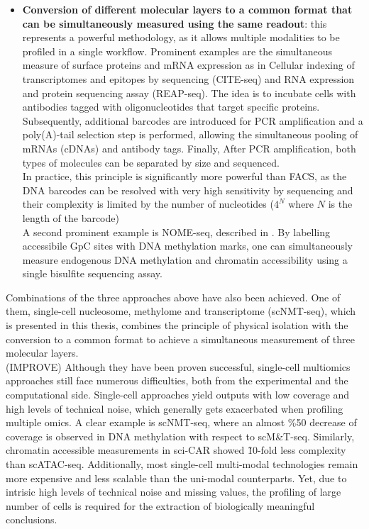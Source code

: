 \begin{itemize}
	\item \textbf{Conversion of different molecular layers to a common format that can be simultaneously measured using the same readout}: this represents a powerful methodology, as it allows multiple modalities to be profiled in a single workflow. Prominent examples are the simultaneous measure of surface proteins and mRNA expression as in Cellular indexing of transcriptomes and epitopes by sequencing (CITE-seq\cite{Stoeckius2017}) and RNA expression and protein sequencing assay (REAP-seq\cite{Peterson2017}). The idea is to incubate cells with antibodies tagged with oligonucleotides that target specific proteins. Subsequently, additional barcodes are introduced for PCR amplification and a poly(A)-tail selection step is performed, allowing the simultaneous pooling of mRNAs (cDNAs) and antibody tags. Finally, After PCR amplification, both types of molecules can be separated by size and sequenced.\\
	In practice, this principle is significantly more powerful than FACS, as the DNA barcodes can be resolved with very high sensitivity by sequencing and their complexity is limited by the number of nucleotides ($4^N$ where $N$ is the length of the barcode)\\
	A second prominent example is NOME-seq, described in . By labelling accessibile GpC sites with DNA methylation marks, one can simultaneously measure endogenous DNA methylation and chromatin accessibility using a single bisulfite sequencing assay.
\end{itemize}
	
Combinations of the three approaches above have also been achieved. One of them, single-cell nucleosome, methylome and transcriptome (scNMT-seq\cite{Clark2018}), which is presented in this thesis, combines the principle of physical isolation with the conversion to a common format to achieve a simultaneous measurement of three molecular layers.\\

(IMPROVE) Although they have been proven successful, single-cell multiomics approaches still face numerous difficulties, both from the experimental and the computational side. Single-cell approaches yield outputs with low coverage and high levels of technical noise, which generally gets exacerbated when profiling multiple omics. A clear example is scNMT-seq, where an almost \%50 decrease of coverage is observed in DNA methylation with respect to scM\&T-seq. Similarly, chromatin accessible measurements in sci-CAR showed \~10-fold less complexity than scATAC-seq. Additionally, most single-cell multi-modal technologies remain more expensive and less scalable than the uni-modal counterparts. Yet, due to intrisic high levels of technical noise and missing values, the profiling of large number of cells is required for the extraction of biologically meaningful conclusions.

